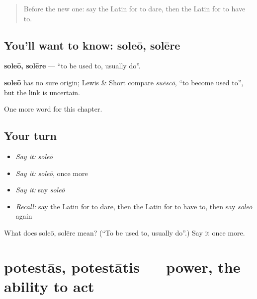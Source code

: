 \label{lesson:LA-C109-soleo}



\begin{quote}
Before the new one: say the Latin for to dare, then the Latin for to have to.
\end{quote}

\subsection*{You'll want to know: soleō, solēre}
\textbf{soleō, solēre} — \textquotedblleft{}to be used to, usually do\textquotedblright{}.

\begin{cousinweb}
\textbf{soleō} has no sure origin; Lewis \& Short compare \emph{suēscō}, \textquotedblleft{}to become used to\textquotedblright{}, but the link is uncertain.
\end{cousinweb}

\begin{grammarlens}[title={What you've built}]
One more word for this chapter.
\end{grammarlens}

\subsection*{Your turn}
\begin{itemize}
\raggedright
  \item \emph{Say it:} \emph{soleō}
  \item \emph{Say it:} \emph{soleō}, once more
  \item \emph{Say it:} say \emph{soleō}
  \item \emph{Recall:} say the Latin for to dare, then the Latin for to have to, then say \emph{soleō} again
\end{itemize}

\begin{tcolorbox}[breakable,colback=teal!4,colframe=teal!35!black,title={Before you move on}]
What does soleō, solēre mean? (\textquotedblleft{}To be used to, usually do\textquotedblright{}.) Say it once more.
\end{tcolorbox}
\section[potestās, potestātis]{potestās, potestātis — power, the ability to act}

\label{lesson:LA-C109-potestas}



